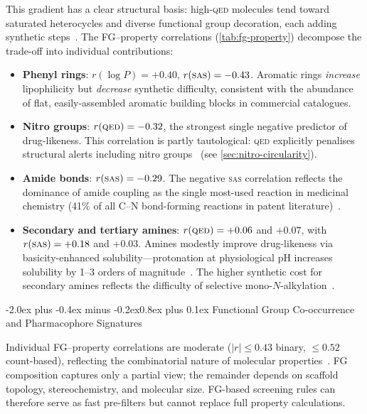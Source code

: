 \documentclass[10pt,a4paper,twocolumn]{article}
\makeatletter
\providecommand{\qed}{}
\let\qed\relax
\newcommand{\qedscore}{\textsc{qed}}
\let\qed\qedscore
\newcommand{\sas}{\textsc{sas}}
\newcommand{\logp}{\ensuremath{\log P}}
\newcommand{\abs}[1]{\ensuremath{\lvert #1 \rvert}}
\renewcommand\subsection{\@startsection{subsection}{2}{\z@}%
  {-2.0ex plus -0.4ex minus -0.2ex}{0.8ex plus 0.1ex}%
  {\normalfont\large\bfseries}}
\makeatother
\begin{document}
This gradient has a clear structural basis: high-\qed{} molecules tend toward saturated heterocycles and diverse functional group decoration, each adding synthetic steps~\cite{roughley2011}. The FG--property correlations (\cref{tab:fg-property}) decompose the trade-off into individual contributions:

\begin{itemize}
    \item \textbf{Phenyl rings}: $r(\logp{}) = +0.40$, $r(\sas{}) = -0.43$. Aromatic rings \emph{increase} lipophilicity but \emph{decrease} synthetic difficulty, consistent with the abundance of flat, easily-assembled aromatic building blocks in commercial catalogues.
    \item \textbf{Nitro groups}: $r(\qed{}) = -0.32$, the strongest single negative predictor of drug-likeness. This correlation is partly tautological: \qed{} explicitly penalises structural alerts including nitro groups~\cite{kazius2005} (see \cref{sec:nitro-circularity}).
    \item \textbf{Amide bonds}: $r(\sas{}) = -0.29$. The negative \sas{} correlation reflects the dominance of amide coupling as the single most-used reaction in medicinal chemistry (41\% of all C--N bond-forming reactions in patent literature)~\cite{brown2016}.
    \item \textbf{Secondary and tertiary amines}: $r(\qed{}) = +0.06$ and $+0.07$, with $r(\sas{}) = +0.18$ and $+0.03$. Amines modestly improve drug-likeness via basicity-enhanced solubility---protonation at physiological pH increases solubility by 1--3 orders of magnitude~\cite{manallack2007,pennington2023}. The higher synthetic cost for secondary amines reflects the difficulty of selective mono-$N$-alkylation~\cite{roughley2011}.
\end{itemize}

\subsection{Functional Group Co-occurrence and Pharmacophore Signatures}

Individual FG--property correlations are moderate ($\abs{r} \leq 0.43$ binary, $\leq 0.52$ count-based), reflecting the combinatorial nature of molecular properties~\cite{tropsha2010}. FG composition captures only a partial view; the remainder depends on scaffold topology, stereochemistry, and molecular size. FG-based screening rules can therefore serve as fast pre-filters but cannot replace full property calculations.
\end{document}
